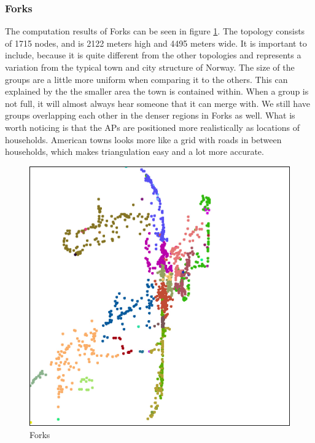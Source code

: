 \documentclass[a4paper,UKenglish]{report}
\begin{document}
\subsubsection{Forks}
	
 The computation results of Forks can be seen in figure \ref{fig:forks_topo}. 
 The topology consists of 1715 nodes, and is 2122 meters high and 4495 meters wide. It
 is important to include, because it is quite different from the other topologies and
 represents a variation from the typical town and city structure of Norway.
 The size of the groups are a little more uniform when comparing it to the others.
 This can explained by the the smaller area the town is contained within. When a group
 is not full, it will almost always hear someone that it can merge with.
 We still have groups overlapping each other in the denser regions in Forks as well. 
 What is worth noticing is that the APs are positioned more realistically as locations
 of households. American towns looks more like a grid with roads in between households,
 which makes triangulation easy and a lot more accurate. 

\begin{figure}
	\center
	\includegraphics[scale=0.46]{Images/cities/forks_groups.jpg}
	\caption{Forks}
	\label{fig:forks_topo}
\end{figure}
\end{document}
